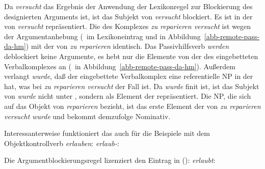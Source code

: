 {Da \emph{versucht} das Ergebnis der Anwendung der Lexikonregel zur Blockierung des designierten Arguments
ist, ist das Subjekt von \emph{versucht} blockiert. 
Es ist in der \dalist von \emph{versucht} repräsentiert. Die \subcatl des Komplexes \emph{zu reparieren versucht}
ist wegen der Argumentanhebung (\, im Lexikoneintrag  und 
in Abbildung~\ref{abb-remote-pass-da-hm}) mit der \subcatl von \emph{zu reparieren} identisch.
Das Passivhilfsverb \emph{werden} deblockiert keine Argumente, es hebt nur die
Elemente von der \subcatl des eingebetteten Verbalkomplexes an (\, in
Abbildung~\ref{abb-remote-pass-da-hm}). Außerdem verlangt \emph{wurde}, daß der eingebettete
Verbalkomplex eine referentielle NP in der \dalist hat, was bei \emph{zu reparieren versucht} der Fall ist.
Da \emph{wurde} finit ist, ist das Subjekt von \emph{wurde} nicht unter \subj, sondern
als Element der \subcatl repräsentiert. Die NP, die sich auf das Objekt von
\emph{reparieren} bezieht, ist das erste Element der \subcatl von \emph{zu reparieren versucht wurde}
und bekommt demzufolge Nominativ.


Interessanterweise funktioniert das auch für die Beispiele mit dem Objektkontrollverb \emph{erlauben}:\label{page-remote-passive-erlauben}
\eas
\emph{erlaub-}:\\
\zs

\noindent
Die Argumentblockierungsregel lizenziert den Eintrag in ():
\eas
\emph{erlaubt}:\\
\zs

}
